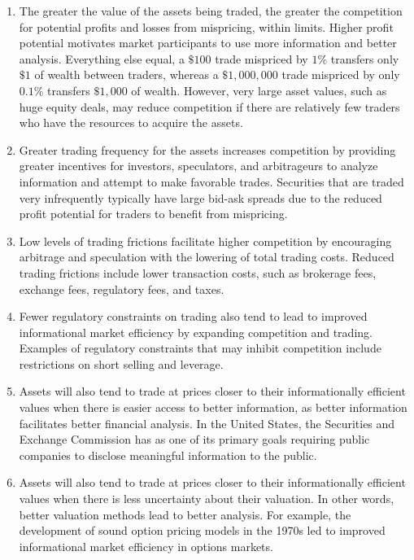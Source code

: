 \documentclass[11pt]{article}
\begin{document}
\begin{enumerate}
  \item The greater the value of the assets being traded, the greater the competition for potential profits and losses from mispricing, within limits. Higher profit potential motivates market participants to use more information and better analysis. Everything else equal, a $\$ 100$ trade mispriced by $1 \%$ transfers only $\$ 1$ of wealth between traders, whereas a $\$ 1,000,000$ trade mispriced by only $0.1 \%$ transfers $\$ 1,000$ of wealth. However, very large asset values, such as huge equity deals, may reduce competition if there are relatively few traders who have the resources to acquire the assets.

  \item Greater trading frequency for the assets increases competition by providing greater incentives for investors, speculators, and arbitrageurs to analyze information and attempt to make favorable trades. Securities that are traded very infrequently typically have large bid-ask spreads due to the reduced profit potential for traders to benefit from mispricing.

  \item Low levels of trading frictions facilitate higher competition by encouraging arbitrage and speculation with the lowering of total trading costs. Reduced trading frictions include lower transaction costs, such as brokerage fees, exchange fees, regulatory fees, and taxes.

  \item Fewer regulatory constraints on trading also tend to lead to improved informational market efficiency by expanding competition and trading. Examples of regulatory constraints that may inhibit competition include restrictions on short selling and leverage.

  \item Assets will also tend to trade at prices closer to their informationally efficient values when there is easier access to better information, as better information facilitates better financial analysis. In the United States, the Securities and Exchange Commission has as one of its primary goals requiring public companies to disclose meaningful information to the public.

  \item Assets will also tend to trade at prices closer to their informationally efficient values when there is less uncertainty about their valuation. In other words, better valuation methods lead to better analysis. For example, the development of sound option pricing models in the 1970s led to improved informational market efficiency in options markets.

\end{enumerate}
\end{document}
